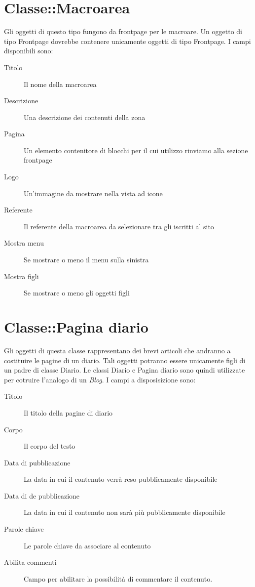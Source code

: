 \section{Classe::Macroarea}
Gli oggetti di questo tipo fungono da frontpage per le macroare. Un oggetto di tipo Frontpage dovrebbe contenere unicamente oggetti di tipo Frontpage. I campi disponibili sono:
\begin{description}
 \item[Titolo]Il nome della macroarea
\item[Descrizione]Una descrizione dei contenuti della zona
\item[Pagina]Un elemento contenitore di blocchi per il cui utilizzo rinviamo alla sezione frontpage
\item[Logo]Un'immagine da mostrare nella vista ad icone 
\item[Referente]Il referente della macroarea da selezionare tra gli iscritti al sito
\item[Mostra menu]Se mostrare o meno il menu sulla sinistra
\item[Mostra figli]Se mostrare o meno gli oggetti figli
\end{description}

\section{Classe::Pagina diario}
Gli oggetti di questa classe rappresentano dei brevi articoli che andranno a costituire le pagine di un diario. Tali oggetti potranno essere unicamente figli di un padre di classe Diario. Le classi Diario e Pagina diario sono quindi utilizzate per cotruire l'analogo di un \textsl{Blog}. I campi a disposisizione sono:
\begin{description}
 \item[Titolo] Il titolo della pagine di diario
\item[Corpo] Il corpo del testo
\item[Data di pubblicazione] La data in cui il contenuto verrà reso pubblicamente disponibile
\item[Data di de pubblicazione]La data in cui il contenuto non sarà più pubblicamente disponibile
\item[Parole chiave]Le parole chiave da associare al contenuto
\item[Abilita commenti] Campo per abilitare la possibilità di commentare il contenuto.
\end{description}

